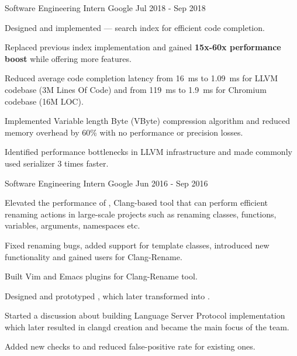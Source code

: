 \begin{cventries}
  \cventry
    {Software Engineering Intern}
    {Google}
    {}
    {Jul 2018 - Sep 2018}
    {
      \begin{cvitems}
        \item Designed and implemented
          --- search index for efficient code completion.
        \item Replaced previous index implementation and gained
          \textbf{15x-60x performance boost} while offering more features.
        \item Reduced average code completion latency from \SI{16}{\ms} to
          \SI{1.09}{\ms} for LLVM codebase (3M Lines Of Code) and from
          \SI{119}{\ms} to \SI{1.9}{\ms} for Chromium codebase (16M LOC).
        \item Implemented Variable length Byte (VByte) compression algorithm
	  and reduced memory overhead by 60\% with no performance or precision
	  losses.
        \item Identified performance bottlenecks in LLVM infrastructure and made
	  commonly used serializer 3 times faster.
      \end{cvitems}
    }

  \cventry
    {Software Engineering Intern}
    {Google}
    {}
    {Jun 2016 - Sep 2016}
    {
      \begin{cvitems}
        \item Elevated the performance of
          ,
          Clang-based tool that can perform efficient renaming actions in
          large-scale projects such as renaming classes, functions, variables,
          arguments, namespaces etc.
        \item Fixed renaming bugs, added support for template classes,
	  introduced new functionality and gained users for Clang-Rename.
        \item Built Vim and Emacs plugins for Clang-Rename tool.
        \item Designed and prototyped
          ,
          which later transformed into .
        \item Started a discussion about building Language Server Protocol
          implementation which later resulted in clangd creation and became the
          main focus of the team.
        \item Added new checks to
           and
          reduced false-positive rate for existing ones.
      \end{cvitems}
    }


\end{cventries}
